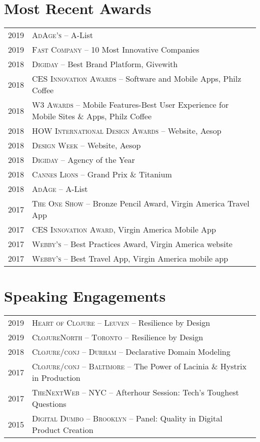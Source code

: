 \documentclass[a4paper,10pt]{article}
\begin{document}
\section{Most Recent Awards}
\begin{tabular}{rl}
  \textsc{2019} & \textsc{AdAge's} -- A-List \\
  \textsc{2019} & \textsc{Fast Company} -- 10 Most Innovative Companies \\
  \textsc{2018} & \textsc{Digiday} -- Best Brand Platform, Givewith \\
  \textsc{2018} & \textsc{CES Innovation Awards} -- Software and Mobile Apps, Philz Coffee \\
  \textsc{2018} & \textsc{W3 Awards} -- Mobile Features-Best User Experience for Mobile Sites \& Apps, Philz Coffee \\
  \textsc{2018} & \textsc{HOW International Design Awards} -- Website, Aesop \\
  \textsc{2018} & \textsc{Design Week} -- Website, Aesop \\
  \textsc{2018} & \textsc{Digiday} -- Agency of the Year \\
  \textsc{2018} & \textsc{Cannes Lions} -- Grand Prix \& Titanium \\
  \textsc{2018} & \textsc{AdAge} -- A-List \\
  \textsc{2017} & \textsc{The One Show} -- Bronze Pencil Award, Virgin America Travel App \\
  \textsc{2017} & \textsc{CES Innovation Award}, Virgin America Mobile App \\
  \textsc{2017} & \textsc{Webby's} -- Best Practices Award, Virgin America website \\
  \textsc{2017} & \textsc{Webby's} -- Best Travel App, Virgin America mobile app \\
\end{tabular}


\section{Speaking Engagements}
\begin{tabular}{rl}
  \textsc{2019} & \textsc{Heart of Clojure -- Leuven} -- Resilience by Design \\
  \textsc{2019} & \textsc{ClojureNorth -- Toronto} -- Resilience by Design \\
  \textsc{2018} & \textsc{Clojure/conj -- Durham} -- Declarative Domain Modeling \\
  \textsc{2017} & \textsc{Clojure/conj -- Baltimore} -- The Power of Lacinia \& Hystrix in Production \\
  \textsc{2017} & \textsc{TheNextWeb -- NYC} -- Afterhour Session: Tech's Toughest Questions \\
  \textsc{2015} & \textsc{Digital Dumbo -- Brooklyn} -- Panel: Quality in Digital Product Creation \\
\end{tabular}
\end{document}
